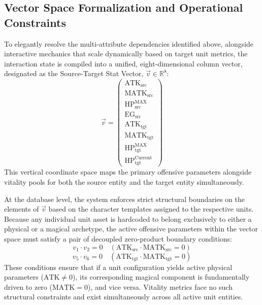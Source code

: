 \documentclass[twocolumn,10pt]{article}
\begin{document}
\subsection{Vector Space Formalization and Operational Constraints}
\label{sec:vector_space}
To elegantly resolve the multi-attribute dependencies identified above, alongside interactive mechanics that scale dynamically based on target unit metrics, the interaction state is compiled into a unified, eight-dimensional column vector, designated as the Source-Target Stat Vector, $\vec{v} \in \mathbb{R}^8$:
\begin{equation}
\vec{v} = \begin{pmatrix} 
\text{ATK}_{\text{src}} \\ 
\text{MATK}_{\text{src}} \\ 
\text{HP}_{\text{src}}^{\text{MAX}} \\
\text{EG}_{\text{src}} \\ 
\text{ATK}_{\text{tgt}} \\ 
\text{MATK}_{\text{tgt}} \\ 
\text{HP}_{\text{tgt}}^{\text{MAX}} \\
\text{HP}_{\text{tgt}}^{\text{Current}} 
\end{pmatrix}
\end{equation}
This vertical coordinate space maps the primary offensive parameters alongside vitality pools for both the source entity and the target entity simultaneously.

At the database level, the system enforces strict structural boundaries on the elements of $\vec{v}$ based on the character templates assigned to the respective units. Because any individual unit asset is hardcoded to belong exclusively to either a physical or a magical archetype, the active offensive parameters within the vector space must satisfy a pair of decoupled zero-product boundary conditions:
\begin{equation}
v_1 \cdot v_2 = 0 \quad (\text{ATK}_{\text{src}} \cdot \text{MATK}_{\text{src}} = 0)
\label{eq:exclusivity_src}
\end{equation}
\begin{equation}
v_5 \cdot v_6 = 0 \quad (\text{ATK}_{\text{tgt}} \cdot \text{MATK}_{\text{tgt}} = 0)
\label{eq:exclusivity_tgt}
\end{equation}
These conditions ensure that if a unit configuration yields active physical parameters ($\text{ATK} \neq 0$), its corresponding magical component is fundamentally driven to zero ($\text{MATK} = 0$), and vice versa. Vitality metrics face no such structural constraints and exist simultaneously across all active unit entities.
\end{document}
